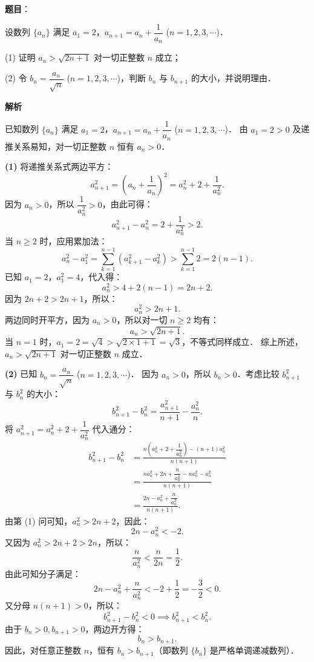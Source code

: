 \begin{answer}

\textbf{题目}：

设数列 $\{a_n\}$ 满足 $a_1 = 2$，$a_{n+1} = a_n + \dfrac{1}{a_n}$ ($n = 1, 2, 3, \cdots$)．

(1) 证明 $a_n > \sqrt{2n + 1}$ 对一切正整数 $n$ 成立；

(2) 令 $b_n = \dfrac{a_n}{\sqrt{n}}$ ($n = 1, 2, 3, \cdots$)，判断 $b_n$ 与 $b_{n+1}$ 的大小，并说明理由．

\textbf{解析}

已知数列 $\{a_n\}$ 满足 $a_1 = 2$，$a_{n+1} = a_n + \dfrac{1}{a_n}$ ($n = 1, 2, 3, \cdots$)．
由 $a_1 = 2 > 0$ 及递推关系易知，对一切正整数 $n$ 恒有 $a_n > 0$．

\textbf{(1)}
将递推关系式两边平方：
\nopagebreak[4]
\[
a_{n+1}^2 = \left(a_n + \frac{1}{a_n}\right)^2 = a_n^2 + 2 + \frac{1}{a_n^2}.
\]
因为 $a_n > 0$，所以 $\dfrac{1}{a_n^2} > 0$，由此可得：
\nopagebreak[4]
\[
a_{n+1}^2 - a_n^2 = 2 + \frac{1}{a_n^2} > 2.
\]
当 $n \geqslant 2$ 时，应用累加法：
\nopagebreak[4]
\[
a_n^2 - a_1^2 = \sum_{k=1}^{n-1} (a_{k+1}^2 - a_k^2) > \sum_{k=1}^{n-1} 2 = 2(n - 1).
\]
已知 $a_1 = 2$，$a_1^2 = 4$，代入得：
\nopagebreak[4]
\[
a_n^2 > 4 + 2(n - 1) = 2n + 2.
\]
因为 $2n + 2 > 2n + 1$，所以：
\nopagebreak[4]
\[
a_n^2 > 2n + 1.
\]
两边同时开平方，因为 $a_n > 0$，所以对一切 $n \geqslant 2$ 均有：
\nopagebreak[4]
\[
a_n > \sqrt{2n + 1}.
\]
当 $n = 1$ 时，$a_1 = 2 = \sqrt{4} > \sqrt{2 \times 1 + 1} = \sqrt{3}$，不等式同样成立．
综上所述，$a_n > \sqrt{2n + 1}$ 对一切正整数 $n$ 成立．

\textbf{(2)}
已知 $b_n = \dfrac{a_n}{\sqrt{n}}$ ($n = 1, 2, 3, \cdots$)．
因为 $a_n > 0$，所以 $b_n > 0$．考虑比较 $b_{n+1}^2$ 与 $b_n^2$ 的大小：
\nopagebreak[4]
\[
b_{n+1}^2 - b_n^2 = \frac{a_{n+1}^2}{n + 1} - \frac{a_n^2}{n}.
\]
将 $a_{n+1}^2 = a_n^2 + 2 + \dfrac{1}{a_n^2}$ 代入通分：
\nopagebreak[4]
\[
\begin{aligned}
b_{n+1}^2 - b_n^2 &= \frac{n\left(a_n^2 + 2 + \dfrac{1}{a_n^2}\right) - (n + 1)a_n^2}{n(n + 1)} \\
&= \frac{n a_n^2 + 2n + \dfrac{n}{a_n^2} - n a_n^2 - a_n^2}{n(n + 1)} \\
&= \frac{2n - a_n^2 + \dfrac{n}{a_n^2}}{n(n + 1)}.
\end{aligned}
\]
由第 (1) 问可知，$a_n^2 > 2n + 2$，因此：
\nopagebreak[4]
\[
2n - a_n^2 < -2.
\]
又因为 $a_n^2 > 2n + 2 > 2n$，所以：
\nopagebreak[4]
\[
\frac{n}{a_n^2} < \frac{n}{2n} = \frac{1}{2}.
\]
由此可知分子满足：
\nopagebreak[4]
\[
2n - a_n^2 + \frac{n}{a_n^2} < -2 + \frac{1}{2} = -\frac{3}{2} < 0.
\]
又分母 $n(n + 1) > 0$，所以：
\nopagebreak[4]
\[
b_{n+1}^2 - b_n^2 < 0 \implies b_{n+1}^2 < b_n^2.
\]
由于 $b_n > 0, b_{n+1} > 0$，两边开方得：
\nopagebreak[4]
\[
b_n > b_{n+1}.
\]
因此，对任意正整数 $n$，恒有 $b_n > b_{n+1}$（即数列 $\{b_n\}$ 是严格单调递减数列）．


\end{answer}
